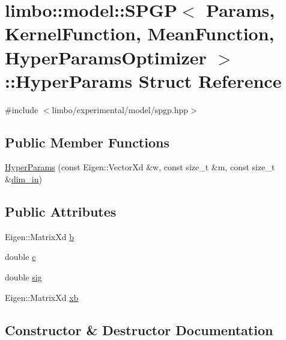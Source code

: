 \hypertarget{structlimbo_1_1model_1_1_s_p_g_p_1_1_hyper_params}{}\section{limbo\+:\+:model\+:\+:S\+P\+G\+P$<$ Params, Kernel\+Function, Mean\+Function, Hyper\+Params\+Optimizer $>$\+:\+:Hyper\+Params Struct Reference}
\label{structlimbo_1_1model_1_1_s_p_g_p_1_1_hyper_params}


{\ttfamily \#include $<$limbo/experimental/model/spgp.\+hpp$>$}

\subsection*{Public Member Functions}
\begin{DoxyCompactItemize}
\item 
\hyperlink{structlimbo_1_1model_1_1_s_p_g_p_1_1_hyper_params_a6451ddb2f4ffc94e9f7c0c9fce7ed520}{Hyper\+Params} (const Eigen\+::\+Vector\+Xd \&w, const size\+\_\+t \&m, const size\+\_\+t \&\hyperlink{classlimbo_1_1model_1_1_s_p_g_p_ab84d7663a814757766c2d630e0bacd9e}{dim\+\_\+in})
\end{DoxyCompactItemize}
\subsection*{Public Attributes}
\begin{DoxyCompactItemize}
\item 
Eigen\+::\+Matrix\+Xd \hyperlink{structlimbo_1_1model_1_1_s_p_g_p_1_1_hyper_params_aa0f5678cadcdfc619c75282c967106ce}{b}
\item 
double \hyperlink{structlimbo_1_1model_1_1_s_p_g_p_1_1_hyper_params_ac7851b66eb3556f595b949ca241fef09}{c}
\item 
double \hyperlink{structlimbo_1_1model_1_1_s_p_g_p_1_1_hyper_params_aaefda5ae138a733a9435e9922582684c}{sig}
\item 
Eigen\+::\+Matrix\+Xd \hyperlink{structlimbo_1_1model_1_1_s_p_g_p_1_1_hyper_params_a867369e27386e051b800653e759443b2}{xb}
\end{DoxyCompactItemize}


\subsection{Constructor \& Destructor Documentation}
\hypertarget{structlimbo_1_1model_1_1_s_p_g_p_1_1_hyper_params_a6451ddb2f4ffc94e9f7c0c9fce7ed520}{}
